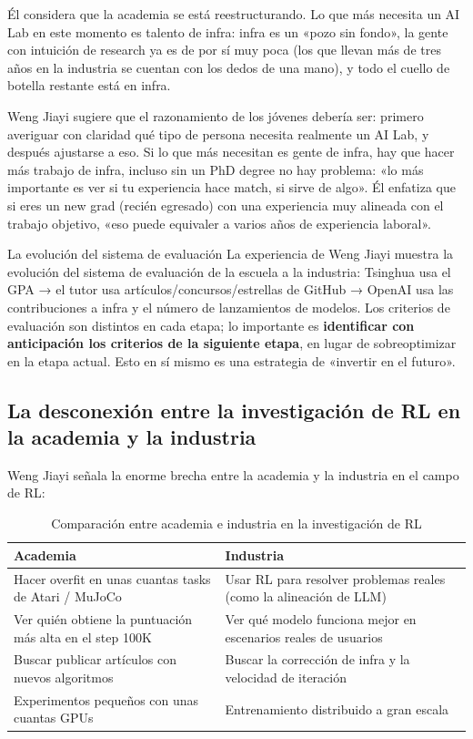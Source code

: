 \documentclass[a4paper]{article}
\begin{document}
Él considera que la academia se está reestructurando. Lo que más necesita un AI Lab en este momento es talento de infra: infra es un «pozo sin fondo», la gente con intuición de research ya es de por sí muy poca (los que llevan más de tres años en la industria se cuentan con los dedos de una mano), y todo el cuello de botella restante está en infra.

Weng Jiayi sugiere que el razonamiento de los jóvenes debería ser: primero averiguar con claridad qué tipo de persona necesita realmente un AI Lab, y después ajustarse a eso. Si lo que más necesitan es gente de infra, hay que hacer más trabajo de infra, incluso sin un PhD degree no hay problema: «lo más importante es ver si tu experiencia hace match, si sirve de algo». Él enfatiza que si eres un new grad (recién egresado) con una experiencia muy alineada con el trabajo objetivo, «eso puede equivaler a varios años de experiencia laboral».

\begin{knowledgebox}{La evolución del sistema de evaluación}
La experiencia de Weng Jiayi muestra la evolución del sistema de evaluación de la escuela a la industria: Tsinghua usa el GPA → el tutor usa artículos/concursos/estrellas de GitHub → OpenAI usa las contribuciones a infra y el número de lanzamientos de modelos. Los criterios de evaluación son distintos en cada etapa; lo importante es \textbf{identificar con anticipación los criterios de la siguiente etapa}, en lugar de sobreoptimizar en la etapa actual. Esto en sí mismo es una estrategia de «invertir en el futuro».
\end{knowledgebox}

\subsection{La desconexión entre la investigación de RL en la academia y la industria}

Weng Jiayi señala la enorme brecha entre la academia y la industria en el campo de RL:

\begin{table}[H]
\centering
\begin{tabular}{ll}
\toprule
\textbf{Academia} & \textbf{Industria} \\
\midrule
Hacer overfit en unas cuantas tasks de Atari / MuJoCo & Usar RL para resolver problemas reales (como la alineación de LLM) \\
Ver quién obtiene la puntuación más alta en el step 100K & Ver qué modelo funciona mejor en escenarios reales de usuarios \\
Buscar publicar artículos con nuevos algoritmos & Buscar la corrección de infra y la velocidad de iteración \\
Experimentos pequeños con unas cuantas GPUs & Entrenamiento distribuido a gran escala \\
\bottomrule
\end{tabular}
\caption{Comparación entre academia e industria en la investigación de RL}
\end{table}
\end{document}
